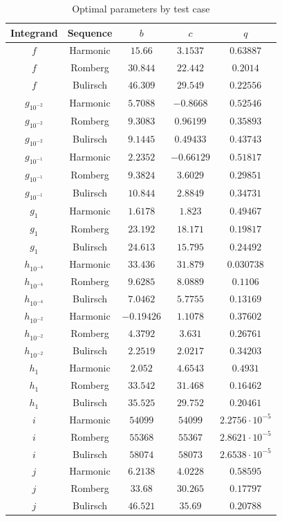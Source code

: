 \begin{table}[H]
    \centering
    \begin{tabular}{c|c||c|c|c}
        Integrand & Sequence & \(b\) & \(c\) & \(q\) \\\hline\hline
$f$ & Harmonic & \(15.66\) & \(3.1537\) & \(0.63887\) \\
$f$ & Romberg & \(30.844\) & \(22.442\) & \(0.2014\) \\
$f$ & Bulirsch & \(46.309\) & \(29.549\) & \(0.22556\) \\
$g_{10^{-2}}$ & Harmonic & \(5.7088\) & \(-0.8668\) & \(0.52546\) \\
$g_{10^{-2}}$ & Romberg & \(9.3083\) & \(0.96199\) & \(0.35893\) \\
$g_{10^{-2}}$ & Bulirsch & \(9.1445\) & \(0.49433\) & \(0.43743\) \\
$g_{10^{-1}}$ & Harmonic & \(2.2352\) & \(-0.66129\) & \(0.51817\) \\
$g_{10^{-1}}$ & Romberg & \(9.3824\) & \(3.6029\) & \(0.29851\) \\
$g_{10^{-1}}$ & Bulirsch & \(10.844\) & \(2.8849\) & \(0.34731\) \\
$g_1$ & Harmonic & \(1.6178\) & \(1.823\) & \(0.49467\) \\
$g_1$ & Romberg & \(23.192\) & \(18.171\) & \(0.19817\) \\
$g_1$ & Bulirsch & \(24.613\) & \(15.795\) & \(0.24492\) \\
$h_{10^{-4}}$ & Harmonic & \(33.436\) & \(31.879\) & \(0.030738\) \\
$h_{10^{-4}}$ & Romberg & \(9.6285\) & \(8.0889\) & \(0.1106\) \\
$h_{10^{-4}}$ & Bulirsch & \(7.0462\) & \(5.7755\) & \(0.13169\) \\
$h_{10^{-2}}$ & Harmonic & \(-0.19426\) & \(1.1078\) & \(0.37602\) \\
$h_{10^{-2}}$ & Romberg & \(4.3792\) & \(3.631\) & \(0.26761\) \\
$h_{10^{-2}}$ & Bulirsch & \(2.2519\) & \(2.0217\) & \(0.34203\) \\
$h_1$ & Harmonic & \(2.052\) & \(4.6543\) & \(0.4931\) \\
$h_1$ & Romberg & \(33.542\) & \(31.468\) & \(0.16462\) \\
$h_1$ & Bulirsch & \(35.525\) & \(29.752\) & \(0.20461\) \\
$i$ & Harmonic & \(54099\) & \(54099\) & \(2.2756\cdot 10^{-5}\) \\
$i$ & Romberg & \(55368\) & \(55367\) & \(2.8621\cdot 10^{-5}\) \\
$i$ & Bulirsch & \(58074\) & \(58073\) & \(2.6538\cdot 10^{-5}\) \\
$j$ & Harmonic & \(6.2138\) & \(4.0228\) & \(0.58595\) \\
$j$ & Romberg & \(33.68\) & \(30.265\) & \(0.17797\) \\
$j$ & Bulirsch & \(46.521\) & \(35.69\) & \(0.20788\) \\
    \end{tabular}
    \caption{Optimal parameters by test case}
    \label{tab:my_label}
\end{table}

